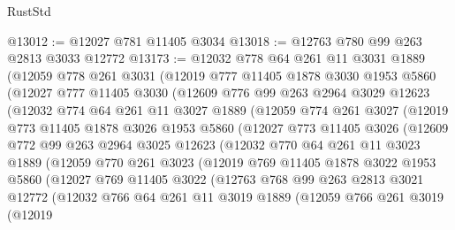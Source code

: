 \begin{lexlean}{RustStd}
\begin{coremodule}
{\begin{coremodule}
{{{{{{{{{{{{{{{{{{{{{{{{{{{{{@13012 := @12027 @781 @11405 @3034
@13018 := @12763 @780 @99 @263 @2813 @3033 @12772
@13173 := @12032
    @778
    @64
    @261
    @11
    @3031
    @1889
    (@12059
      @778
      @261
      @3031
      (@12019
        @777
        @11405
        @1878
        @3030
        @1953
        @5860
        (@12027
          @777
          @11405
          @3030
          (@12609
            @776
            @99
            @263
            @2964
            @3029
            @12623
            (@12032
              @774
              @64
              @261
              @11
              @3027
              @1889
              (@12059
                @774
                @261
                @3027
                (@12019
                  @773
                  @11405
                  @1878
                  @3026
                  @1953
                  @5860
                  (@12027
                    @773
                    @11405
                    @3026
                    (@12609
                      @772
                      @99
                      @263
                      @2964
                      @3025
                      @12623
                      (@12032
                        @770
                        @64
                        @261
                        @11
                        @3023
                        @1889
                        (@12059
                          @770
                          @261
                          @3023
                          (@12019
                            @769
                            @11405
                            @1878
                            @3022
                            @1953
                            @5860
                            (@12027
                              @769
                              @11405
                              @3022
                              (@12763
                                @768
                                @99
                                @263
                                @2813
                                @3021
                                @12772
                                (@12032
                                  @766
                                  @64
                                  @261
                                  @11
                                  @3019
                                  @1889
                                  (@12059
                                    @766
                                    @261
                                    @3019
                                    (@12019
}}}}}}}}}}}}}}}}}}}}}}}}}}}}}
\end{coremodule}}
\end{coremodule}
\end{lexlean}
